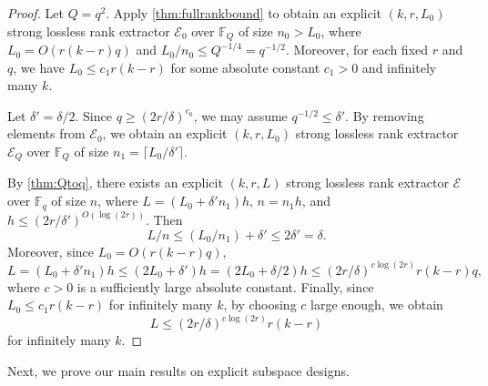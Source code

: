 \documentclass[11pt]{article}
\newcommand{\F}{\mathbb{F}}
\begin{document}
\begin{proof}
Let $Q=q^2$. Apply \cref{thm:fullrankbound} to obtain an explicit $(k,r,L_0)$ strong lossless rank extractor $\mathcal{E}_0$ over $\F_Q$ of size $n_0 > L_0$, where $L_0 = O(r(k-r)q)$ and $L_0/n_0\le Q^{-1/4}=q^{-1/2}$. Moreover, for each fixed $r$ and $q$, we have $L_0\le c_1 r(k-r)$ for some absolute constant $c_1>0$ and infinitely many $k$.

Let $\delta'=\delta/2$. Since $q\ge (2r/\delta)^{c_0}$, we may assume $q^{-1/2}\le \delta'$.
By removing elements from $\mathcal{E}_0$, we obtain an explicit $(k,r,L_0)$ strong lossless rank extractor $\mathcal{E}_Q$ over $\F_Q$ of size $n_1=\lceil L_0/\delta'\rceil$.

By \cref{thm:Qtoq}, there exists an explicit $(k,r,L)$ strong lossless rank extractor $\mathcal{E}$ over $\F_q$ of size $n$, where $L=(L_0+\delta' n_1)h$, $n=n_1 h$, and $h\le (2r/\delta')^{O(\log(2r))}$. Then
\[
L/n\le (L_0/n_1)+\delta'\le 2\delta'=\delta.
\]
Moreover, since $L_0=O(r(k-r)q)$,
\[
L=(L_0+\delta'n_1)h \le (2L_0+\delta')h = (2L_0+\delta/2)h \le (2r/\delta)^{c\log (2r)} r(k-r)q,
\]
where $c>0$ is a sufficiently large absolute constant.
Finally, since $L_0\le c_1 r(k-r)$ for infinitely many $k$, by choosing $c$ large enough, we obtain
\[
L \le (2r/\delta)^{c\log (2r)} r(k-r)
\]
for infinitely many $k$.
\end{proof}

Next, we prove our main results on explicit subspace designs.
\end{document}
